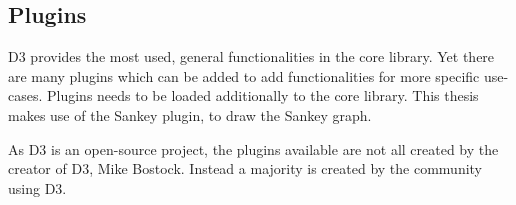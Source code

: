 \subsection{Plugins}

D3 provides the most used, general functionalities in the core library. Yet there are many plugins which can be added to add functionalities for more specific use-cases. Plugins needs to be loaded additionally to the core library. This thesis makes use of the Sankey plugin\cite{Sankey_package}, to draw the Sankey graph.

As D3 is an open-source project, the plugins available are not all created by the creator of D3, Mike Bostock. Instead a majority is created by the community using D3.
